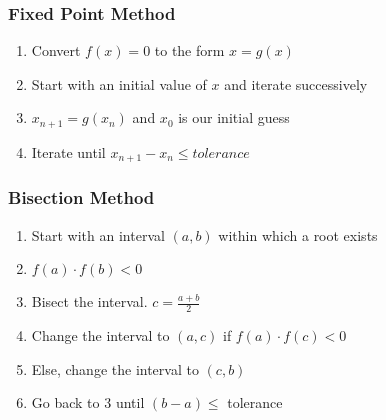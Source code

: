 \documentclass[14pt,compress]{beamer}
\begin{document}

\begin{frame}[fragile]
\frametitle{Fixed Point Method}
\begin{enumerate}
\item Convert $f(x)=0$ to the form $x=g(x)$
\item Start with an initial value of $x$ and iterate successively
\item $x_{n+1}=g(x_n)$ and $x_0$ is our initial guess
\item Iterate until $x_{n+1}-x_n \le tolerance$
\end{enumerate}
\end{frame}


\begin{frame}[fragile]
\frametitle{Bisection Method}
\begin{enumerate}
\item Start with an interval $(a, b)$ within which a root exists
\item $f(a)\cdot f(b) < 0$
\item Bisect the interval. $c = \frac{a+b}{2}$
\item Change the interval to $(a, c)$ if $f(a)\cdot f(c) < 0$
\item Else, change the interval to $(c, b)$
\item Go back to 3 until $(b-a) \le$ tolerance
\end{enumerate}
\end{frame}

\end{document}
